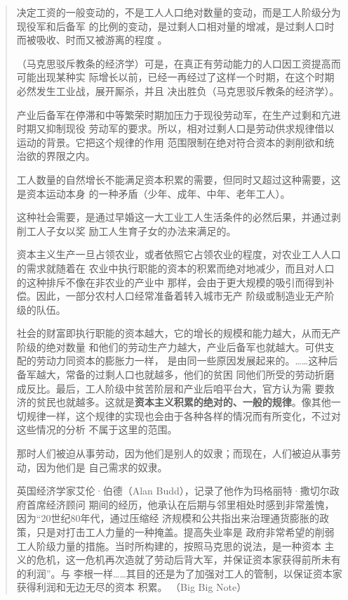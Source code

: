 \begin{quotation}
决定工资的一般变动的，不是工人人口绝对数量的变动，而是工人阶级分为现役军和后备军
的比例的变动，是过剩人口相对量的增减，是过剩人口时而被吸收、时而又被游离的程度
。

（马克思驳斥教条的经济学）可是，在真正有劳动能力的人口因工资提高而可能出现某种实
际增长以前，已经一再经过了这样一个时期，在这个时期必然发生工业战，展开厮杀，并且
决出胜负（马克思驳斥教条的经济学）。

产业后备军在停滞和中等繁荣时期加压力于现役劳动军，在生产过剩和亢进时期又抑制现役
劳动军的要求。所以，相对过剩人口是劳动供求规律借以运动的背景。它把这个规律的作用
范围限制在绝对符合资本的剥削欲和统治欲的界限之内。
\bigskip


工人数量的自然增长不能满足资本积累的需要，但同时又超过这种需要，这是资本运动本身
的一种矛盾（少年、成年、中年、老年工人）。

这种社会需要，是通过早婚这一大工业工人生活条件的必然后果，并通过剥削工人子女以奖
励工人生育子女的办法来满足的。

资本主义生产一旦占领农业，或者依照它占领农业的程度，对农业工人人口的需求就随着在
农业中执行职能的资本的积累而绝对地减少，而且对人口的这种排斥不像在非农业的产业中
那样，会由于更大规模的吸引而得到补偿。因此，一部分农村人口经常准备着转入城市无产
阶级或制造业无产阶级的队伍。

社会的财富即执行职能的资本越大，它的增长的规模和能力越大，从而无产阶级的绝对数量
和他们的劳动生产力越大，产业后备军也就越大。可供支配的劳动力同资本的膨胀力一样，
是由同一些原因发展起来的。……这种后备军越大，常备的过剩人口也就越多，他们的贫困
同他们所受的劳动折磨成反比。最后，工人阶级中贫苦阶层和产业后咱平台大，官方认为需
要救济的贫民也就越多。这就是\textbf{资本主义积累的绝对的、一般的规律}。像其他一
切规律一样，这个规律的实现也会由于各种各样的情况而有所变化，不过对这些情况的分析
不属于这里的范围。

那时人们被迫从事劳动，因为他们是别人的奴隶；而现在，人们被迫从事劳动，因为他们是
自己需求的奴隶。

英国经济学家艾伦·伯德（Alan Budd），记录了他作为玛格丽特·撒切尔政府首席经济顾问
期间的经历，他承认在后期与邻里相处时感到非常羞愧，因为“20世纪80年代，通过压缩经
济规模和公共指出来治理通货膨胀的政策，只是对打击工人力量的一种掩盖。提高失业率是
政府非常希望的削弱工人阶级力量的措施。当时所构建的，按照马克思的说法，是一种资本
主义的危机，这一危机再次造就了劳动后背大军，并保证资本家获得前所未有的利润”。与
李根一样……其目的还是为了加强对工人的管制，以保证资本家获得利润和无边无尽的资本
积累。 
（Big Big Note）


\end{quotation}
